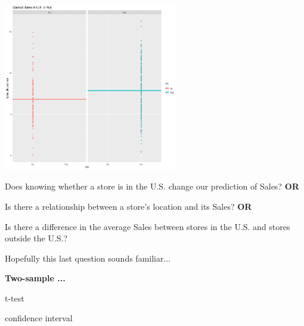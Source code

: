\begin{frame}
\pause
\begin{center}
	\includegraphics[width = 3in]{SalesUSPointsMeans.png}
\end{center}
\end{frame}

\begin{frame}
\bi
	\item Does knowing whether a store is in the U.S. change our prediction of Sales? \textbf{OR}
	\pause
	\item Is there a relationship between a store's location and its Sales? \textbf{OR}
	\pause
	\item Is there a difference in the average Sales between stores in the U.S. and stores outside the U.S.?
	\pause
		\bi
			\item Hopefully this last question sounds familiar...
		\ei
	\pause
\ei
\begin{center}
	\textbf{Two-sample ...}
\end{center}
\pause
\bi
	\item t-test
	\item confidence interval
\ei
\end{frame}

